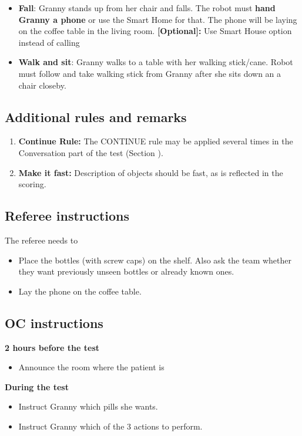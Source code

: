 \begin{enumerate}
\begin{itemize}
 		\item \textbf{Fall}: Granny stands up from her chair and falls. The robot must \textbf{hand Granny a phone} or use the Smart Home for that. 
								The phone will be laying on the coffee table in the living room.
								\textbf{[Optional]:} Use Smart House option instead of calling
 		\item \textbf{Walk and sit}: Granny walks to a table with her walking stick/cane. Robot must follow and take walking stick from Granny after she sits down an a chair closeby.
 	\end{itemize}
\end{enumerate}


\subsection{Additional rules and remarks}
\begin{enumerate}
\item \textbf{Continue Rule:} The CONTINUE rule may be applied several times in the Conversation part of the test (Section ).
\item \textbf{Make it fast:} Description of objects should be fast, as is reflected in the scoring.
\end{enumerate}

\subsection{Referee instructions}

The referee needs to
\begin{itemize}
\item Place the bottles (with screw caps) on the shelf. Also ask the team whether they want previously unseen bottles or already known ones.
\item Lay the phone on the coffee table.
\end{itemize}

\subsection{OC instructions}

\textbf{2 hours before the test}
\begin{itemize}
\item Announce the room where the patient is
\end{itemize}
\textbf{During the test}
\begin{itemize}
\item Instruct Granny which pills she wants.
\item Instruct Granny which of the 3 actions to perform.
\end{itemize}

